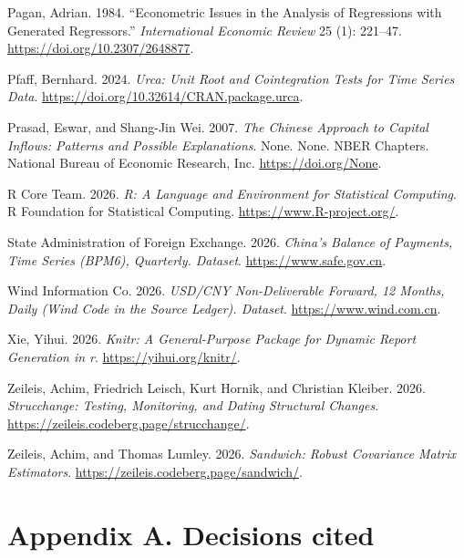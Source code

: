 \documentclass[
  12pt,
  a4paper,
]{article}
\newlength{\cslhangindent}
\newenvironment{CSLReferences}[2] %
 {\begin{list}{}{%
  \setlength{\itemindent}{0pt}
  \setlength{\leftmargin}{0pt}
  \setlength{\parsep}{0pt}
  \ifodd #1
   \setlength{\leftmargin}{\cslhangindent}
   \setlength{\itemindent}{-1\cslhangindent}
  \fi
  \setlength{\itemsep}{#2\baselineskip}}}
 {\end{list}}
\begin{document}
\begin{CSLReferences}{1}{1}
Pagan, Adrian. 1984. {``Econometric Issues in the Analysis of
Regressions with Generated Regressors.''} \emph{International Economic
Review} 25 (1): 221--47. \url{https://doi.org/10.2307/2648877}.

Pfaff, Bernhard. 2024. \emph{Urca: Unit Root and Cointegration Tests for
Time Series Data}. \url{https://doi.org/10.32614/CRAN.package.urca}.

Prasad, Eswar, and Shang-Jin Wei. 2007. \emph{The Chinese Approach to
Capital Inflows: Patterns and Possible Explanations}. None. None. NBER
Chapters. National Bureau of Economic Research, Inc.
\url{https://doi.org/None}.

R Core Team. 2026. \emph{R: A Language and Environment for Statistical
Computing}. R Foundation for Statistical Computing.
\url{https://www.R-project.org/}.

State Administration of Foreign Exchange. 2026. \emph{China's Balance of
Payments, Time Series (BPM6), Quarterly. Dataset}.
\url{https://www.safe.gov.cn}.

Wind Information Co. 2026. \emph{USD/CNY Non-Deliverable Forward, 12
Months, Daily (Wind Code in the Source Ledger). Dataset}.
\url{https://www.wind.com.cn}.

Xie, Yihui. 2026. \emph{Knitr: A General-Purpose Package for Dynamic
Report Generation in r}. \url{https://yihui.org/knitr/}.

Zeileis, Achim, Friedrich Leisch, Kurt Hornik, and Christian Kleiber.
2026. \emph{Strucchange: Testing, Monitoring, and Dating Structural
Changes}. \url{https://zeileis.codeberg.page/strucchange/}.

Zeileis, Achim, and Thomas Lumley. 2026. \emph{Sandwich: Robust
Covariance Matrix Estimators}.
\url{https://zeileis.codeberg.page/sandwich/}.

\end{CSLReferences}

\section*{Appendix A. Decisions
cited}\label{appendix-a.-decisions-cited}
\end{document}
